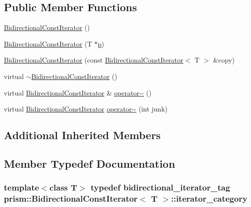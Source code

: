 \subsection*{Public Member Functions}
\begin{DoxyCompactItemize}
\item 
\hyperlink{classprism_1_1_bidirectional_const_iterator_a0881c1366c162179a1520a5839405d91}{Bidirectional\+Const\+Iterator} ()
\item 
\hyperlink{classprism_1_1_bidirectional_const_iterator_ad978eb6303350cf1792ea08cbea3a69e}{Bidirectional\+Const\+Iterator} (T $\ast$\hyperlink{classprism_1_1_forward_const_iterator_ad4e0c824b923c399c6ee381a03e66df2}{p})
\item 
\hyperlink{classprism_1_1_bidirectional_const_iterator_a56b09aacc65ce4e85dd5bafadea743e5}{Bidirectional\+Const\+Iterator} (const \hyperlink{classprism_1_1_bidirectional_const_iterator}{Bidirectional\+Const\+Iterator}$<$ T $>$ \&copy)
\item 
virtual \hyperlink{classprism_1_1_bidirectional_const_iterator_af102c28eb4cfb7abe7536b2b3cf6a8a2}{$\sim$\+Bidirectional\+Const\+Iterator} ()
\item 
virtual \hyperlink{classprism_1_1_bidirectional_const_iterator}{Bidirectional\+Const\+Iterator} \& \hyperlink{classprism_1_1_bidirectional_const_iterator_a07e29d93a60b80b710b1953aa2a2eefd}{operator-\/-\/} ()
\item 
virtual \hyperlink{classprism_1_1_bidirectional_const_iterator}{Bidirectional\+Const\+Iterator} \hyperlink{classprism_1_1_bidirectional_const_iterator_ae15fb4417b2e026f547d1eb1a71306fe}{operator-\/-\/} (int junk)
\end{DoxyCompactItemize}
\subsection*{Additional Inherited Members}


\subsection{Member Typedef Documentation}
\subsubsection[{\texorpdfstring{iterator\+\_\+category}{iterator_category}}]{\setlength{\rightskip}{0pt plus 5cm}template$<$class T$>$ typedef {\bf bidirectional\+\_\+iterator\+\_\+tag} {\bf prism\+::\+Bidirectional\+Const\+Iterator}$<$ T $>$\+::{\bf iterator\+\_\+category}}\hypertarget{classprism_1_1_bidirectional_const_iterator_a71244ea545ce4dd225e6ad1e5d6f64a6}{}\label{classprism_1_1_bidirectional_const_iterator_a71244ea545ce4dd225e6ad1e5d6f64a6}



